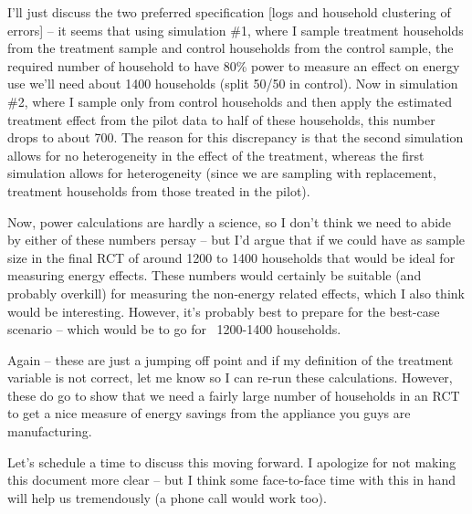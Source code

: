 \documentclass[10pt]{article}\usepackage[]{graphicx}\usepackage[]{color}
\begin{document}
I'll just discuss the two preferred specification [logs and household clustering of errors] -- it seems that using simulation \#1, where I sample treatment households from the treatment sample and control households from the control sample,  the required number of household to have 80\% power to measure an effect on energy use we'll need about 1400 households (split 50/50 in control).  Now in simulation \#2, where I sample only from control households and then apply the estimated treatment effect from the pilot data to half of these households, this number drops to about 700.  The reason for this discrepancy is that the second simulation allows for no heterogeneity in the effect of the treatment, whereas the first simulation allows for heterogeneity (since we are sampling with replacement, treatment households from those treated in the pilot).

Now, power calculations are hardly a science, so I don't think we need to abide by either of these numbers persay -- but I'd argue that if we could have as sample size in the final RCT of around 1200 to 1400 households that would be ideal for measuring energy effects.  These numbers would certainly be suitable (and probably overkill) for measuring the non-energy related effects, which I also think would be interesting.  However, it's probably best to prepare for the best-case scenario -- which would be to go for ~1200-1400 households. 

Again -- these are just a jumping off point and if my definition of the treatment variable is not correct, let me know so I can re-run these calculations.  However, these do go to show that we need a fairly large number of households in an RCT to get a nice measure of energy savings from the appliance you guys are manufacturing.  

Let's schedule a time to discuss this moving forward.  I apologize for not making this document more clear -- but I think some face-to-face time with this in hand will help us tremendously (a phone call would work too).
\end{document}
